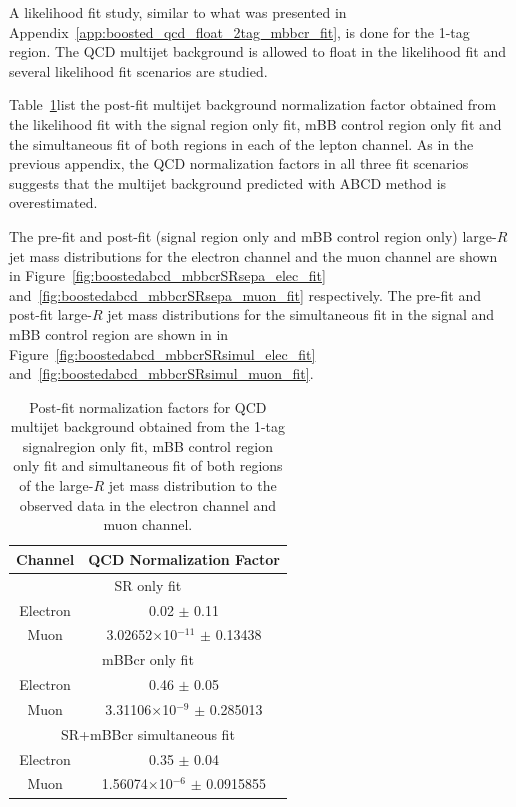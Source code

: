 A likelihood fit study, similar to what was presented in Appendix~\ref{app:boosted_qcd_float_2tag_mbbcr_fit}, is done for the 
1-tag region. The QCD multijet background is allowed to float in the likelihood fit and several likelihood fit scenarios are 
studied.

Table~\ref{tab:boosted_qcdfitstudies_1tag_normfact}list the post-fit multijet background normalization factor obtained 
from the likelihood fit with the signal region only fit, mBB control region only fit and the simultaneous fit of both regions
in each of the lepton channel. As in the previous appendix, the QCD normalization factors in all three fit scenarios suggests 
that the multijet background predicted with ABCD method is overestimated.

The pre-fit and post-fit (signal region only and mBB control region only) large-$R$ jet mass distributions 
for the electron channel and the muon channel are shown in Figure~\ref{fig:boostedabcd_mbbcrSRsepa_elec_fit} and~\ref{fig:boostedabcd_mbbcrSRsepa_muon_fit}
respectively. The pre-fit and post-fit large-$R$ jet mass distributions for the simultaneous fit in the signal and mBB control region are shown in 
in Figure~\ref{fig:boostedabcd_mbbcrSRsimul_elec_fit} and~\ref{fig:boostedabcd_mbbcrSRsimul_muon_fit}.


\begin{table}
\begin{center}
\begin{tabular}{c|c}
Channel  & QCD Normalization Factor  \\
\hline    
\multicolumn{2}{c}{SR only fit} \\
\hline
Electron &  0.02 $\pm$ 0.11 \\
Muon     &  3.02652$\times$10$^{-11}$  $\pm$  0.13438 \\
\hline    
\multicolumn{2}{c}{mBBcr only fit} \\
\hline
Electron &  0.46      $\pm$ 0.05 \\
Muon     &  3.31106$\times$10$^{-9}$  $\pm$  0.285013 \\
\hline    
\multicolumn{2}{c}{SR+mBBcr simultaneous fit} \\
\hline
Electron &  0.35  $\pm$ 0.04 \\
Muon     &  1.56074$\times$10$^{-6}$  $\pm$  0.0915855 \\
\end{tabular}
\end{center}
\caption{Post-fit normalization factors for QCD multijet background obtained 
from the 1-tag signalregion only fit, mBB control region only fit and simultaneous
fit of both regions of the large-$R$ jet mass distribution to the observed data 
in the electron channel and muon channel.} 
\label{tab:boosted_qcdfitstudies_1tag_normfact}
\end{table}

